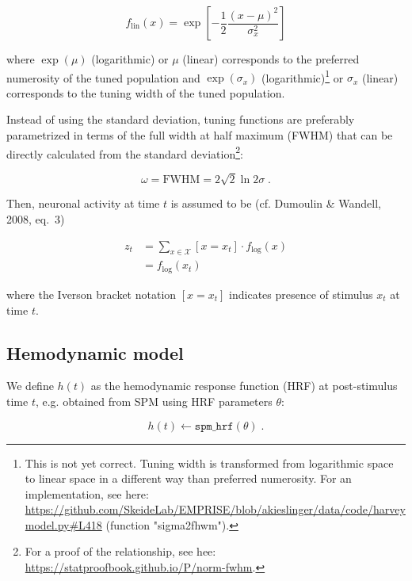 \documentclass[a4paper,12pt]{article}
\begin{document}
\begin{equation} \label{eq:f-lin}
f_\mathrm{lin}(x) = \exp \left[ -\frac{1}{2} \frac{(x - \mu)^2}{\sigma_x^2} \right]
\end{equation}

where $\exp(\mu)$ (logarithmic) or $\mu$ (linear) corresponds to the preferred numerosity of the tuned population and $\exp(\sigma_x)$ (logarithmic)\footnote{This is not yet correct. Tuning width is transformed from logarithmic space to linear space in a different way than preferred numerosity. For an implementation, see here: \url{https://github.com/SkeideLab/EMPRISE/blob/akieslinger/data/code/harveymodel.py#L418} (function "sigma2fhwm").} or $\sigma_x$ (linear) corresponds to the tuning width of the tuned population.

Instead of using the standard deviation, tuning functions are preferably parametrized in terms of the full width at half maximum (FWHM) that can be directly calculated from the standard deviation\footnote{For a proof of the relationship, see hee: \url{https://statproofbook.github.io/P/norm-fwhm}.}:

\begin{equation} \label{eq:fwhm-sigma}
\omega = \mathrm{FWHM} = 2 \sqrt{2} \ln 2 \sigma \; .
\end{equation}

Then, neuronal activity at time $t$ is assumed to be (cf. Dumoulin \& Wandell, 2008, eq.~3)

\begin{equation} \label{eq:z-t}
\begin{split}
z_t &= \sum_{x \in \mathcal{X}} \left[ x = x_t \right] \cdot f_\mathrm{log}(x) \\
&= f_\mathrm{log}(x_t)
\end{split}
\end{equation}

where the Iverson bracket notation $\left[ x = x_t \right]$ indicates presence of stimulus $x_t$ at time $t$.


\subsection{Hemodynamic model}

We define $h(t)$ as the hemodynamic response function (HRF) at post-stimulus time $t$, e.g. obtained from SPM using HRF parameters $\theta$:

\begin{equation} \label{eq:HRF}
h(t) \leftarrow \mathtt{spm\_hrf}(\theta) \; .
\end{equation}
\end{document}
